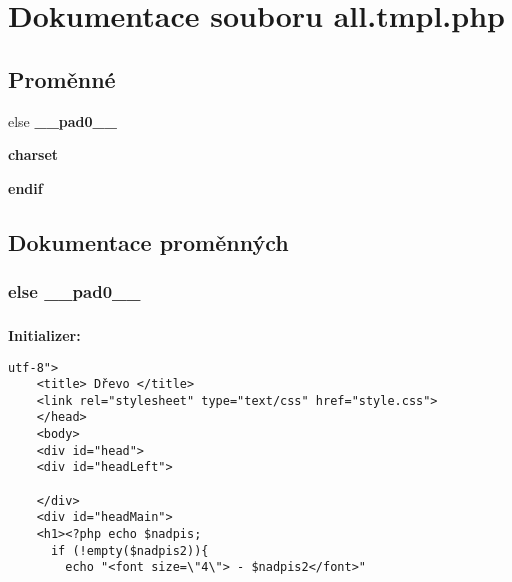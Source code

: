 \section{Dokumentace souboru all.tmpl.php}
\label{all_8tmpl_8php}
\subsection*{Proměnné}
\begin{CompactItemize}
\item 
else {\bf \_\-\_\-pad0\_\-\_\-}
\item 
{\bf charset}
\item 
{\bf endif}
\end{CompactItemize}


\subsection{Dokumentace proměnných}
\subsubsection{\setlength{\rightskip}{0pt plus 5cm}else {\bf \_\-\_\-pad0\_\-\_\-}}\label{all_8tmpl_8php_8e01dcc96c43199448ee66f7c2ae8ea6}


\subsubsection{}\label{all_8tmpl_8php_8bd4accafd4e712317ed9a471738a971}


\textbf{Initializer:}

\begin{Code}\begin{verbatim}utf-8">
    <title> Dřevo </title>
    <link rel="stylesheet" type="text/css" href="style.css">
    </head>
    <body>
    <div id="head">
    <div id="headLeft">
    
    </div>
    <div id="headMain">
    <h1><?php echo $nadpis;
      if (!empty($nadpis2)){
        echo "<font size=\"4\"> - $nadpis2</font>"
\end{verbatim}
\end{Code}
\subsubsection{}\label{all_8tmpl_8php_82cd33ca97ff99f2fcc5e9c81d65251b}


